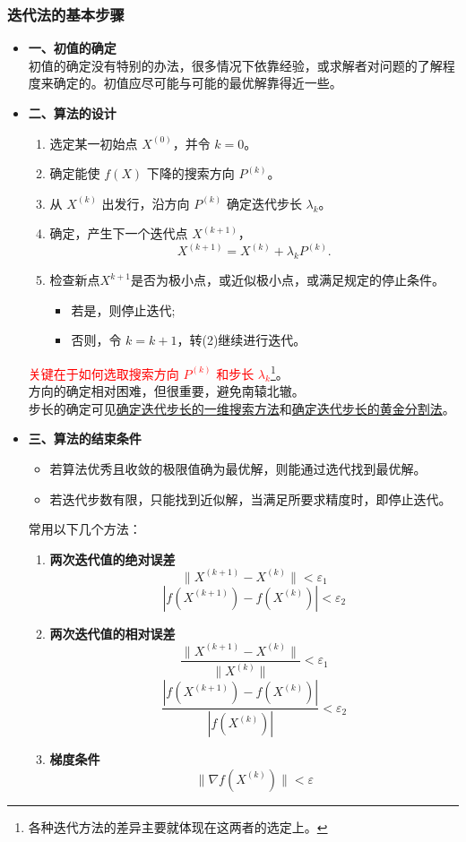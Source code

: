 \subsubsection{迭代法的基本步骤}
\begin{itemize}
\item \textbf{一、初值的确定}\\初值的确定没有特别的办法，很多情况下依靠经验，或求解者对问题的了解程度来确定的。初值应尽可能与可能的最优解靠得近一些。
\item \textbf{二、算法的设计}
\begin{enumerate}
    \item 选定某一初始点 $X^{(0)}$，并令 $k=0$。

    \item 确定能使 $f(X)$ 下降的搜索方向 $P^{(k)}$。

    \item 从 $X^{(k)}$ 出发行，沿方向 $P^{(k)}$ 确定迭代步长 $\lambda_k$。

    \item 确定，产生下一个迭代点 $X^{(k+1)}$，
    \[
    X^{(k+1)} = X^{(k)} + \lambda_k P^{(k)}.
    \]
    \item 检查新点$X^{k+1}$是否为极小点，或近似极小点，或满足规定的停止条件。
    \begin{itemize}
        \item 若是，则停止迭代;
        \item 否则，令 $k=k+1$，转(2)继续进行迭代。
    \end{itemize}
\end{enumerate}
\textcolor{red}{关键在于如何选取搜索方向 $P^{(k)}$ 和步长 $\lambda_k$}\footnote{各种迭代方法的差异主要就体现在这两者的选定上。}。
\\方向的确定相对困难，但很重要，避免南辕北辙。
\\步长的确定可见\hyperref[确定迭代步长的一维搜索方法]{确定迭代步长的一维搜索方法}和\hyperref[确定迭代步长的黄金分割法]{确定迭代步长的黄金分割法}。
\item \textbf{三、算法的结束条件}
\begin{itemize}
    \item 若算法优秀且收敛的极限值确为最优解，则能通过选代找到最优解。
    \item 若迭代步数有限，只能找到近似解，当满足所要求精度时，即停止迭代。
\end{itemize}
常用以下几个方法：
\begin{enumerate}
    \item \textbf{两次迭代值的绝对误差}
    \[
    \| X^{(k+1)} - X^{(k)} \| < \varepsilon_1
    \]
    \[
    | f(X^{(k+1)}) - f(X^{(k)}) | < \varepsilon_2
    \]

    \item \textbf{两次迭代值的相对误差}
    \[
    \frac{\| X^{(k+1)} - X^{(k)} \|}{\| X^{(k)} \|} < \varepsilon_1
    \]
    \[
    \frac{| f(X^{(k+1)}) - f(X^{(k)}) |}{| f(X^{(k)}) |} < \varepsilon_2
    \]

    \item \textbf{梯度条件}
    \[
    \| \nabla f(X^{(k)}) \| < \varepsilon
    \]
\end{enumerate}
\end{itemize}


